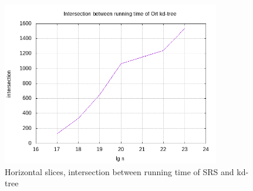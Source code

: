 \begin{figure}[h]
    \centering
    \includegraphics[width = 0.85\textwidth]{pictures/analysis/hori.png}
    \caption{Horizontal slices, intersection between running time of SRS and kd-tree}\label{fig:hori_intersection}
\end{figure}

